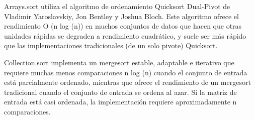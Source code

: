 \documentclass[12pt,letterpaper]{article}
\begin{document}
Arrays.sort utiliza el algoritmo de ordenamiento Quicksort Dual-Pivot de Vladimir Yaroslavskiy, Jon Bentley y Joshua Bloch. Este algoritmo ofrece el rendimiento O (n log (n)) en muchos conjuntos de datos que hacen que otras unidades rápidas se degraden a rendimiento cuadrático, y suele ser más rápido que las implementaciones tradicionales (de un solo pivote) Quicksort.

Collection.sort implementa un mergesort estable, adaptable e iterativo que requiere muchas menos comparaciones n log (n) cuando el conjunto de entrada está parcialmente ordenado, mientras que ofrece el rendimiento de un mergesort tradicional cuando el conjunto de entrada se ordena al azar. Si la matriz de entrada está casi ordenada, la implementación requiere aproximadamente n comparaciones.
\newpage
\vskip 0.4cm
\end{document}
